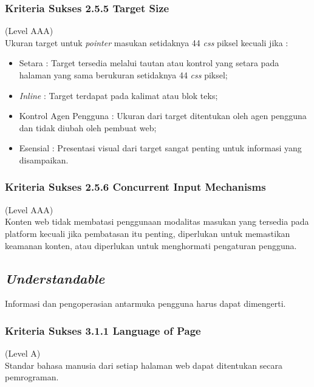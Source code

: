 \documentclass[a4paper,twoside]{article}
\begin{document}
\begin{enumerate}
		\subsubsection*{Kriteria Sukses 2.5.5 Target Size}
		\label{subsubsec:kriteria_2.5.5}
		(Level AAA) \\
		
		Ukuran target untuk \textit{pointer} masukan setidaknya 44 \textit{css} piksel kecuali jika :
		
		\begin{itemize}
			\item Setara : Target tersedia melalui tautan atau kontrol yang setara pada halaman yang sama berukuran setidaknya 44 \textit{css} piksel;
			\item \textit{Inline} : Target terdapat pada kalimat atau blok teks;
			\item Kontrol Agen Pengguna : Ukuran dari target ditentukan oleh agen pengguna dan tidak diubah oleh pembuat web;
			\item Esensial : Presentasi visual dari target sangat penting untuk informasi yang disampaikan.
		\end{itemize}
		
		\subsubsection*{Kriteria Sukses 2.5.6 Concurrent Input Mechanisms}
		\label{subsubsec:kriteria_2.5.6}
		(Level AAA) \\
		
		Konten web tidak membatasi penggunaan modalitas masukan yang tersedia pada platform kecuali jika pembatasan itu penting, diperlukan untuk memastikan keamanan konten, atau diperlukan untuk menghormati pengaturan pengguna.
		
		\subsection*{\textit{Understandable}}
		\label{subsec:understandable}
		Informasi dan pengoperasian antarmuka pengguna harus dapat dimengerti.
		
		\subsubsection*{Kriteria Sukses 3.1.1 Language of Page}
		\label{subsubsec:kriteria_3.1.1}
		(Level A) \\
		
		Standar bahasa manusia dari setiap halaman web dapat ditentukan secara pemrograman.
		

\end{enumerate}
\end{document}
